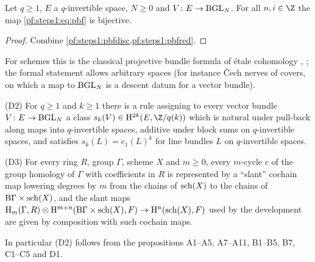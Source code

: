 \begin{theorem}\label{pf:steps1:D1}
Let $q\ge1$, $E$ a $q$-invertible space, $N\ge0$ and $V\colon E\to\mathrm{BGL}_N$. For all $n,i\in\Z$ the map
\eqref{pf:steps1:eq:pbf} is bijective.
\end{theorem}

\begin{proof}
Combine \cref{pf:steps1:pbfdisc,pf:steps1:pbfred}.
\end{proof}

For schemes this is the classical projective bundle formula of \'etale cohomology
\cite{Grothendieck1958}, \cite[Exp.~VII]{Grothendieck1977}; the formal statement allows arbitrary spaces (for
instance \v{C}ech nerves of covers, on which a map to $\mathrm{BGL}_N$ is a descent datum for a vector bundle).

\begin{theorem}\label{pf:steps1:D2}
\textup{(D2)} For $q\ge1$ and $k\ge1$ there is a rule assigning to every vector bundle $V\colon E\to\mathrm{BGL}_N$ a class
$s_k(V)\in\stepsIH^{2k}(E,\Z/q(k))$ which is natural under pull-back along maps into $q$-invertible spaces, additive
under block sums on $q$-invertible spaces, and satisfies $s_k(L)=c_1(L)^k$ for line bundles $L$ on $q$-invertible
spaces.

\textup{(D3)} For every ring $R$, group $\Gamma$, scheme $X$ and $m\ge0$, every $m$-cycle $c$ of the group homology of
$\Gamma$ with coefficients in $R$ is represented by a ``slant'' cochain map lowering degrees by $m$ from the chains of
$\mathrm{sch}(X)$ to the chains of $\mathrm B\Gamma\times\mathrm{sch}(X)$, and the slant maps
$\mathrm{H}_m(\Gamma,R)\otimes\mathrm{H}^{m+n}(\mathrm B\Gamma\times\mathrm{sch}(X),F)\to\mathrm{H}^n(\mathrm{sch}(X),F)$ used by the
development are given by composition with such cochain maps.

In particular \textup{(D2)} follows from the propositions A1--A5, A7--A11, B1--B5, B7, C1--C5 and D1.
\end{theorem}

